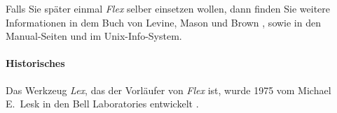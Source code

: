 Falls Sie sp\"ater einmal \textsl{Flex}\/ selber einsetzen wollen, dann finden Sie weitere Informationen
in dem Buch von Levine, Mason und Brown \cite{levine92}, sowie in den Manual-Seiten und 
im Unix-Info-System.

\paragraph{Historisches}
Das Werkzeug \textsl{Lex}\/, das der Vorl\"aufer von \textsl{Flex}\/ ist, wurde 1975 vom Michael
E.~Lesk in den Bell Laboratories entwickelt \cite{lesk:1975}.
\pagebreak



